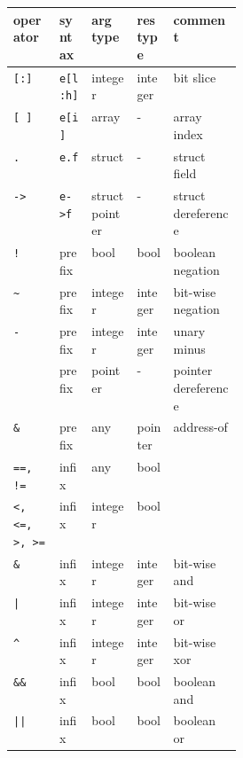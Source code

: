 \documentclass{report}
\newcommand{\src}[1]{\texttt{#1}}
\begin{document}
\begin{table}
\begin{small}
\noindent
\begin{tabular}{|l|l|l|l|p{0.3\linewidth}|}
    \hline
    {\bf operator}                   & {\bf syntax} & {\bf arg type} & {\bf res type} & {\bf comment} \\
    \hline
    \hline 
    {\tt[:]}                         & {\tt e[l:h]} & integer        & integer        & bit slice \\
    {\tt[~]}                         & {\tt e[i]}   & array          & -              & array index \\
    {\tt.}                           & {\tt e.f}    & struct         & -              & struct field \\
    {\tt\verb=->=}                   & {\tt\verb=e->f=}  & struct pointer & -              & struct dereference \\
    \hline
    \src{!}                          & prefix  & bool           & bool           & boolean negation \\
    {\tt\verb=~=}                    & prefix  & integer        & integer        & bit-wise negation \\
    {\tt-}                           & prefix  & integer        & integer        & unary minus \\
    {\tt*}                           & prefix  & pointer        & -              & pointer dereference \\
    {\tt \&}                         & prefix  & any            & pointer        & address-of \\
    \hline
    {\tt ==, !=}                     & infix   & any            & bool           & \\
    {\tt\verb#<, <=, >, >=#}         & infix   & integer        & bool           & \\
    \hline    
    {\tt\&}                          & infix   & integer        & integer        & bit-wise and \\
    \hline    
    {\tt |}                          & infix   & integer        & integer        & bit-wise or \\
    \hline    
    {\tt\verb#^#}                    & infix   & integer        & integer        & bit-wise xor \\
    \hline    
    {\tt\&\&}                        & infix   & bool           & bool           & boolean and \\
    \hline    
    {\tt||}                          & infix   & bool           & bool           & boolean or \\

\end{tabular}
\end{small}
\end{table}
\end{document}

